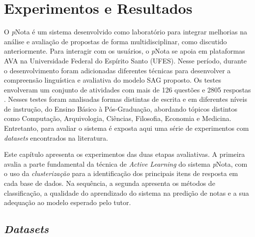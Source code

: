 \chapter{Experimentos e Resultados}
\label{cap-experimentos}

O \textit{p}Nota é um sistema desenvolvido como laboratório para integrar melhorias na análise e avaliação de propostas de forma multidisciplinar, como discutido anteriormente. Para interagir com os usuários, o \textit{p}Nota se apoia em plataformas AVA na Universidade Federal do Espírito Santo (UFES). Nesse período, durante o desenvolvimento foram adicionadas diferentes técnicas para desenvolver a compreensão linguística e avaliativa do modelo SAG proposto. Os testes envolveram um conjunto de atividades com mais de 126 questões e 2805 respostas \cite{spalenza2016a}. Nesses testes foram analisadas formas distintas de escrita e em diferentes níveis de instrução, do Ensino Básico à Pós-Graduação, abordando tópicos distintos como Computação, Arquivologia, Ciências, Filosofia, Economia e Medicina. Entretanto, para avaliar o sistema é exposta aqui uma série de experimentos com \textit{datasets} encontrados na literatura.

Este capítulo apresenta os experimentos das duas etapas avaliativas. A primeira avalia a parte fundamental da técnica de \textit{Active Learning} do sistema \textit{p}Nota, com o uso da \textit{clusterização} para a identificação dos principais itens de resposta em cada base de dados. Na sequência, a segunda apresenta os métodos de classificação, a qualidade do aprendizado do sistema na predição de notas e a sua adequação ao modelo esperado pelo tutor.

\section{\textit{Datasets}}

